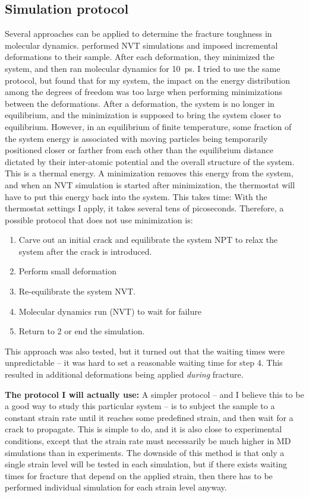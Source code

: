 \subsection{Simulation protocol}
Several approaches can be applied to determine the fracture toughness in molecular dynamics. \citet{Hantal2014} performed NVT simulations and imposed incremental deformations to their sample. After each deformation, they minimized the system, and then ran molecular dynamics for \SI{10}{\pico\second}. I tried to use the same protocol, but found that for my system, the impact on the energy distribution among the degrees of freedom was too large when performing minimizations between the deformations. After a deformation, the system is no longer in equilibrium, and the minimization is supposed to bring the system closer to equilibrium. However, in an equilibrium of finite temperature, some fraction of the system energy is associated with moving particles being temporarily positioned closer or farther from each other than the equilibrium distance dictated by their inter-atomic potential and the overall structure of the system. This is a thermal energy. A minimization removes this energy from the system, and when an NVT simulation is started after minimization, the thermostat will have to put this energy back into the system. This takes time: With the thermostat settings I apply, it takes several tens of picoseconds. Therefore, a possible protocol that does not use minimization is:
\begin{enumerate}
\item Carve out an initial crack and equilibrate the system NPT to relax the system after the crack is introduced.
\item Perform small deformation
\item Re-equilibrate the system NVT.
\item Molecular dynamics run (NVT) to wait for failure
\item Return to 2 or end the simulation. 
\end{enumerate}
This approach was also tested, but it turned out that the waiting times were unpredictable -- it was hard to set a reasonable waiting time for step 4. This resulted in additional deformations being applied \emph{during} fracture. 
%
\begin{framed}
\textbf{The protocol I will actually use:} A simpler protocol -- and I believe this to be a good way to study this particular system -- is to subject the sample to a constant strain rate until it reaches some predefined strain, and then wait for a crack to propagate. This is simple to do, and it is also close to experimental conditions, except that the strain rate must necessarily be much higher in MD simulations than in experiments. The downside of this method is that only a single strain level will be tested in each simulation, but if there exists waiting times for fracture that depend on the applied strain, then there has to be performed individual simulation for each strain level anyway.
\end{framed}

